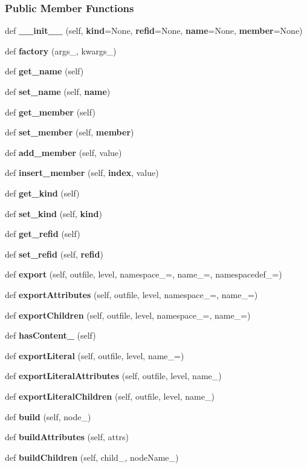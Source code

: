 \subsubsection*{Public Member Functions}
\begin{DoxyCompactItemize}
\item 
def {\bf \+\_\+\+\_\+init\+\_\+\+\_\+} (self, {\bf kind}=None, {\bf refid}=None, {\bf name}=None, {\bf member}=None)
\item 
def {\bf factory} (args\+\_\+, kwargs\+\_\+)
\item 
def {\bf get\+\_\+name} (self)
\item 
def {\bf set\+\_\+name} (self, {\bf name})
\item 
def {\bf get\+\_\+member} (self)
\item 
def {\bf set\+\_\+member} (self, {\bf member})
\item 
def {\bf add\+\_\+member} (self, value)
\item 
def {\bf insert\+\_\+member} (self, {\bf index}, value)
\item 
def {\bf get\+\_\+kind} (self)
\item 
def {\bf set\+\_\+kind} (self, {\bf kind})
\item 
def {\bf get\+\_\+refid} (self)
\item 
def {\bf set\+\_\+refid} (self, {\bf refid})
\item 
def {\bf export} (self, outfile, level, namespace\+\_\+=\textquotesingle{}\textquotesingle{}, name\+\_\+=\textquotesingle{}, namespacedef\+\_\+=\textquotesingle{}\textquotesingle{})
\item 
def {\bf export\+Attributes} (self, outfile, level, namespace\+\_\+=\textquotesingle{}\textquotesingle{}, name\+\_\+=\textquotesingle{})
\item 
def {\bf export\+Children} (self, outfile, level, namespace\+\_\+=\textquotesingle{}\textquotesingle{}, name\+\_\+=\textquotesingle{})
\item 
def {\bf has\+Content\+\_\+} (self)
\item 
def {\bf export\+Literal} (self, outfile, level, name\+\_\+=\textquotesingle{})
\item 
def {\bf export\+Literal\+Attributes} (self, outfile, level, name\+\_\+)
\item 
def {\bf export\+Literal\+Children} (self, outfile, level, name\+\_\+)
\item 
def {\bf build} (self, node\+\_\+)
\item 
def {\bf build\+Attributes} (self, attrs)
\item 
def {\bf build\+Children} (self, child\+\_\+, node\+Name\+\_\+)
\end{DoxyCompactItemize}
